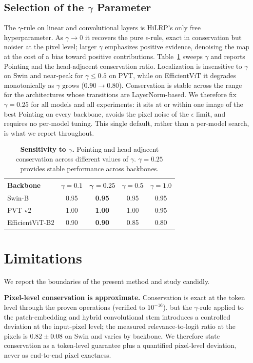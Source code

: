 \documentclass[lettersize,journal]{IEEEtran}
\begin{document}
\subsection{Selection of the $\gamma$ Parameter}
\label{sec:gamma}
The $\gamma$-rule on linear and convolutional layers is HiLRP's only free hyperparameter. As $\gamma\to0$ it recovers the pure $\epsilon$-rule, exact in conservation but noisier at the pixel level; larger $\gamma$ emphasizes positive evidence, denoising the map at the cost of a bias toward positive contributions. Table~\ref{tab:gamma} sweeps $\gamma$ and reports Pointing and the head-adjacent conservation ratio. Localization is insensitive to $\gamma$ on Swin and near-peak for $\gamma\le0.5$ on PVT, while on EfficientViT it degrades monotonically as $\gamma$ grows ($0.90\to0.80$). Conservation is stable across the range for the architectures whose transitions are LayerNorm-based. We therefore fix $\gamma=0.25$ for all models and all experiments: it sits at or within one image of the best Pointing on every backbone, avoids the pixel noise of the $\epsilon$ limit, and requires no per-model tuning. This single default, rather than a per-model search, is what we report throughout.

\begin{table}[h]
  \centering
  \caption{\textbf{Sensitivity to $\gamma$.} Pointing and head-adjacent conservation across different values of $\gamma$. $\gamma{=}0.25$ provides stable performance across backbones.}
  \label{tab:gamma}
  \setlength{\tabcolsep}{5pt}
  \begin{tabular}{l cccc}
    \toprule
    Backbone & $\gamma{=}0.1$ & $\bm{\gamma{=}0.25}$ & $\gamma{=}0.5$ & $\gamma{=}1.0$ \\
    \midrule
    Swin-B          & 0.95 & \textbf{0.95} & 0.95 & 0.95 \\
    PVT-v2          & 1.00 & \textbf{1.00} & 1.00 & 0.95 \\
    EfficientViT-B2 & 0.90 & \textbf{0.90} & 0.85 & 0.80 \\
    \bottomrule
  \end{tabular}
\end{table}

\section{Limitations}
\label{sec:limitations}
We report the boundaries of the present method and study candidly.

\textbf{Pixel-level conservation is approximate.} Conservation is exact at the token level through the proven operations (verified to $10^{-16}$), but the $\gamma$-rule applied to the patch-embedding and hybrid convolutional stem introduces a controlled deviation at the input-pixel level; the measured relevance-to-logit ratio at the pixels is $0.82\pm0.08$ on Swin and varies by backbone. We therefore state conservation as a token-level guarantee plus a quantified pixel-level deviation, never as end-to-end pixel exactness.
\end{document}
